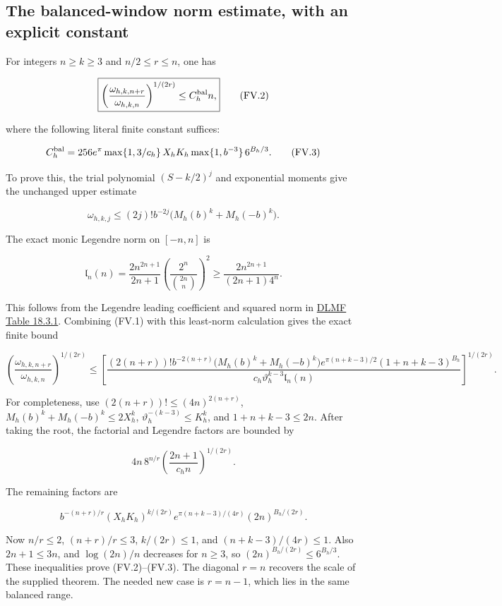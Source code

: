 \subsection[\hspace{0.4em}The balanced-window norm estimate, with an explicit constant]{The balanced-window norm estimate, with an explicit constant}\label{four-volume-the-balanced-window-norm-estimate-with-an-explicit-constant}

For integers \(n\ge k\ge3\) and \(n/2\le r\le n\), one has

\[
\boxed{\left(\frac{\omega_{h,k,n+r}}{\omega_{h,k,n}}\right)^{1/(2r)}
\le C_h^{\rm bal} n,}
\tag{FV.2}
\]

where the following literal finite constant suffices:

\[
C_h^{\rm bal}=256e^\pi\max\{1,3/c_h\}\,X_hK_h
\max\{1,b^{-3}\}\,6^{B_h/3}.
\tag{FV.3}
\]

To prove this, the trial polynomial \((S-k/2)^j\) and exponential moments give the unchanged upper estimate

\[
\omega_{h,k,j}\le(2j)!b^{-2j}
\bigl(M_h(b)^k+M_h(-b)^k\bigr).
\]

The exact monic Legendre norm on \([-n,n]\) is

\[
\mathfrak l_n(n)=\frac{2n^{2n+1}}{2n+1}
\left(\frac{2^n}{\binom{2n}{n}}\right)^2
\ge\frac{2n^{2n+1}}{(2n+1)4^n}.
\]

This follows from the Legendre leading coefficient and squared norm in \href{https://dlmf.nist.gov/18.3\#T1}{DLMF Table 18.3.1}. Combining (FV.1) with this least-norm calculation gives the exact finite bound

\[
\left(\frac{\omega_{h,k,n+r}}{\omega_{h,k,n}}\right)^{1/(2r)}
\le\left[
\frac{(2(n+r))!b^{-2(n+r)}
\bigl(M_h(b)^k+M_h(-b)^k\bigr)
e^{\pi(n+k-3)/2}(1+n+k-3)^{B_h}}
{c_h\vartheta_h^{k-3}\mathfrak l_n(n)}
\right]^{1/(2r)}.
\tag{FV.4}
\]

For completeness, use \((2(n+r))!\le(4n)^{2(n+r)}\), \(M_h(b)^k+M_h(-b)^k\le2X_h^k\), \(\vartheta_h^{-(k-3)}\le K_h^k\), and \(1+n+k-3\le2n\). After taking the root, the factorial and Legendre factors are bounded by

\[
4n\,8^{n/r}\left(\frac{2n+1}{c_h n}\right)^{1/(2r)}.
\]

The remaining factors are

\[
b^{-(n+r)/r}(X_hK_h)^{k/(2r)}
e^{\pi(n+k-3)/(4r)}(2n)^{B_h/(2r)}.
\]

Now \(n/r\le2\), \((n+r)/r\le3\), \(k/(2r)\le1\), and \((n+k-3)/(4r)\le1\). Also \(2n+1\le3n\), and \(\log(2n)/n\) decreases for \(n\ge3\), so \((2n)^{B_h/(2r)}\le6^{B_h/3}\). These inequalities prove (FV.2)--(FV.3). The diagonal \(r=n\) recovers the scale of the supplied theorem. The needed new case is \(r=n-1\), which lies in the same balanced range.

